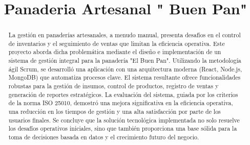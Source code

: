 \documentclass[conference]{IEEEtran}
\begin{document}
\title{Panaderia Artesanal " Buen Pan"}

\author{
\and
{}
\and
{}
\and
{}
}

\maketitle

\begin{abstract}
La gestión en panaderías artesanales, a menudo manual, presenta desafíos en el control de inventarios y el seguimiento de ventas que limitan la eficiencia operativa. Este proyecto aborda dicha problemática mediante el diseño e implementación de un sistema de gestión integral para la panadería "El Buen Pan". Utilizando la metodología ágil Scrum, se desarrolló una aplicación con una arquitectura moderna (React, Node.js, MongoDB) que automatiza procesos clave. El sistema resultante ofrece funcionalidades robustas para la gestión de insumos, control de productos, registro de ventas y generación de reportes estratégicos. La evaluación del sistema, guiada por los criterios de la norma ISO 25010, demostró una mejora significativa en la eficiencia operativa, una reducción en los tiempos de gestión y una alta satisfacción por parte de los usuarios finales. Se concluye que la solución tecnológica implementada no solo resuelve los desafíos operativos iniciales, sino que también proporciona una base sólida para la toma de decisiones basada en datos y el crecimiento futuro del negocio.
\end{abstract}
\end{document}
